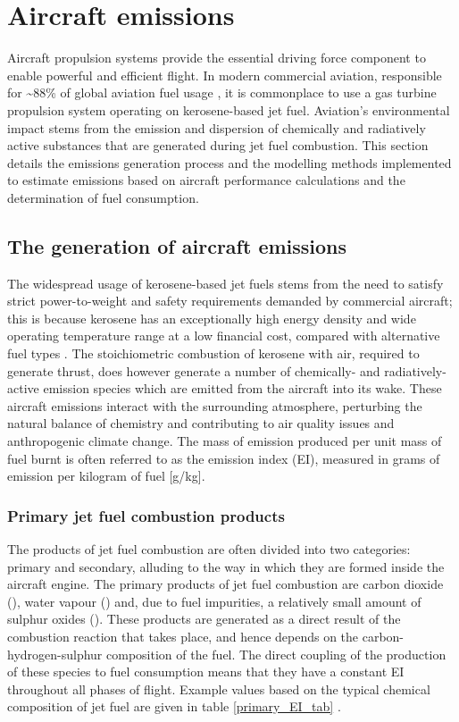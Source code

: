 \section{Aircraft emissions}
\label{emissions}
Aircraft propulsion systems provide the essential driving force component to enable powerful and efficient flight. In modern commercial aviation, responsible for \textasciitilde88\% of global aviation fuel usage \cite{Gossling2020}, it is commonplace to use a gas turbine propulsion system operating on kerosene-based jet fuel. Aviation's environmental impact stems from the emission and dispersion of chemically and radiatively active substances that are generated during jet fuel combustion. This section details the emissions generation process and the modelling methods implemented to estimate emissions based on aircraft performance calculations and the determination of fuel consumption.

\subsection{The generation of aircraft emissions}
The widespread usage of kerosene-based jet fuels stems from the need to satisfy strict power-to-weight and safety requirements demanded by commercial aircraft; this is because kerosene has an exceptionally high energy density and wide operating temperature range at a low financial cost, compared with alternative fuel types \cite{Hemighaus2007, USDOE_2020}. The stoichiometric combustion of kerosene with air, required to generate thrust, does however generate a number of chemically- and radiatively-active emission species which are emitted from the aircraft into its wake. These aircraft emissions interact with the surrounding atmosphere, perturbing the natural balance of chemistry and contributing to air quality issues and anthropogenic climate change. The mass of emission produced per unit mass of fuel burnt is often referred to as the emission index (EI), measured in grams of emission per kilogram of fuel [g/kg].

\subsubsection{Primary jet fuel combustion products}
The products of jet fuel combustion are often divided into two categories: primary and secondary, alluding to the way in which they are formed inside the aircraft engine. The primary products of jet fuel combustion are carbon dioxide (), water vapour () and, due to fuel impurities, a relatively small amount of sulphur oxides (). These products are generated as a direct result of the combustion reaction that takes place, and hence depends on the carbon-hydrogen-sulphur composition of the fuel. The direct coupling of the production of these species to fuel consumption means that they have a constant EI throughout all phases of flight. Example values based on the typical chemical composition of jet fuel are given in table \ref{primary_EI_tab} \cite{IPCC1999}.

